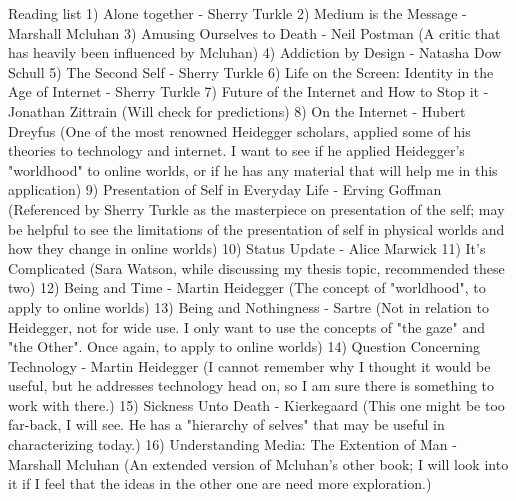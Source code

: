 Reading list
1) Alone together - Sherry Turkle
2) Medium is the Message - Marshall Mcluhan
3) Amusing Ourselves to Death - Neil Postman (A critic that has heavily been influenced by Mcluhan)
4) Addiction by Design - Natasha Dow Schull
5) The Second Self - Sherry Turkle
6) Life on the Screen: Identity in the Age of Internet - Sherry Turkle
7) Future of the Internet and How to Stop it - Jonathan Zittrain (Will check for predictions)
8) On the Internet - Hubert Dreyfus (One of the most renowned Heidegger scholars, applied some of his theories to technology and internet. 
I want to see if he applied Heidegger's "worldhood" to online worlds, or if he has any material that will help me in this application)
9) Presentation of Self in Everyday Life - Erving Goffman (Referenced by Sherry Turkle as the masterpiece on presentation of the self; may
be helpful to see the limitations of the presentation of self in physical worlds and how they change in online worlds)
10) Status Update - Alice Marwick
11) It's Complicated (Sara Watson, while discussing my thesis topic, recommended these two)
12) Being and Time - Martin Heidegger (The concept of "worldhood", to apply to online worlds)
13) Being and Nothingness - Sartre (Not in relation to Heidegger, not for wide use. I only want to use the concepts of "the gaze" and 
"the Other". Once again, to apply to online worlds)
14) Question Concerning Technology - Martin Heidegger (I cannot remember why I thought it would be useful, but he addresses technology head on,
so I am sure there is something to work with there.)
15) Sickness Unto Death - Kierkegaard (This one might be too far-back, I will see. He has a "hierarchy of selves" that may be useful in
characterizing today.)
16) Understanding Media: The Extention of Man - Marshall Mcluhan (An extended version of Mcluhan's other book; I will look into it if 
I feel that the ideas in the other one are need more exploration.)
